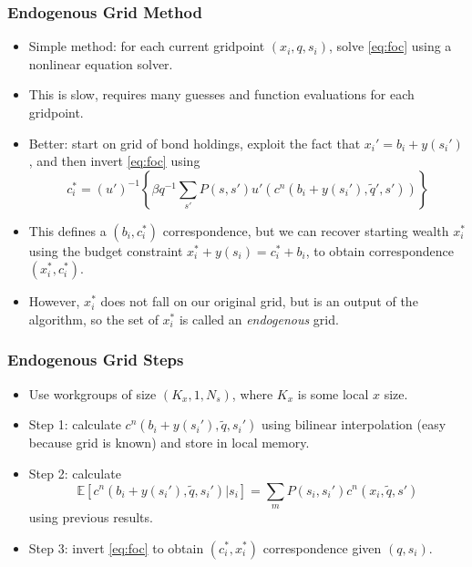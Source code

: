 \documentclass[handout]{beamer}
\newcommand{\E}{\mathbb{E}}
\theoremstyle{definition}
\begin{document}
\begin{frame}
  \frametitle{Endogenous Grid Method}
  \begin{itemize}[<+->]
  \item Simple method: for each current gridpoint $(x_i, q, s_i)$, solve \eqref{eq:foc} using a nonlinear equation solver.
  \item This is slow, requires many guesses and function evaluations for each gridpoint.
  \item Better: start on grid of bond holdings, exploit the fact that $x_i' = b_i + y(s_i')$, and then invert \eqref{eq:foc} using
    \[ c_i^* = (u')^{-1} \left\{ \beta q^{-1} \sum_{s'} P(s,s') u'(c^n(b_i + y(s_i'), \tilde{q}', s')) \right\} \]
  \item This defines a $(b_i, c_i^*)$ correspondence, but we can recover starting wealth $x_i^*$ using the budget constraint $x_i^* + y(s_i) = c_i^* + b_i$, to obtain correspondence $(x_i^*, c_i^*)$.
  \item However, $x_i^*$ does not fall on our original grid, but is an output of the algorithm, so the set of $x_i^*$ is called an \emph{endogenous} grid.
  \end{itemize}
\end{frame}

\begin{frame}
  \frametitle{Endogenous Grid Steps}
  \begin{itemize}
  \item Use workgroups of size $(K_x, 1, N_s)$, where $K_x$ is some local $x$ size.
  \item Step 1: calculate $c^n(b_i + y(s_i'), \tilde{q}, s_i')$ using bilinear interpolation (easy because grid is known) and store in local memory.
  \item Step 2: calculate
    \[ \E \left[ c^n(b_i + y(s_i'), \tilde{q}, s_i') | s_i \right] = \sum_m P(s_i, s_i') c^n(x_i, \tilde{q}, s') \]
    using previous results.
  \item Step 3: invert \eqref{eq:foc} to obtain $(c_i^*, x_i^*)$ correspondence given $(q, s_i)$.
  \end{itemize}
\end{frame}
\end{document}
